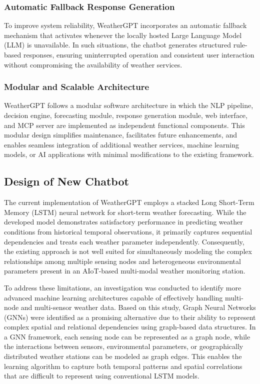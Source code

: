 \documentclass[12pt]{article}
\begin{document}
\subsubsection{Automatic Fallback Response Generation}
To improve system reliability, WeatherGPT incorporates an automatic fallback mechanism that activates whenever the locally hosted Large Language Model (LLM) is unavailable. In such situations, the chatbot generates structured rule-based responses, ensuring uninterrupted operation and consistent user interaction without compromising the availability of weather services.

\subsubsection{Modular and Scalable Architecture}
WeatherGPT follows a modular software architecture in which the NLP pipeline, decision engine, forecasting module, response generation module, web interface, and MCP server are implemented as independent functional components. This modular design simplifies maintenance, facilitates future enhancements, and enables seamless integration of additional weather services, machine learning models, or AI applications with minimal modifications to the existing framework.

\subsection{Design of New Chatbot}
The current implementation of WeatherGPT employs a stacked Long Short-Term Memory (LSTM) neural network for short-term weather forecasting. While the developed model demonstrates satisfactory performance in predicting weather conditions from historical temporal observations, it primarily captures sequential dependencies and treats each weather parameter independently. Consequently, the existing approach is not well suited for simultaneously modeling the complex relationships among multiple sensing nodes and heterogeneous environmental parameters present in an AIoT-based multi-modal weather monitoring station.

To address these limitations, an investigation was conducted to identify more advanced machine learning architectures capable of effectively handling multi-node and multi-sensor weather data. Based on this study, Graph Neural Networks (GNNs) were identified as a promising alternative due to their ability to represent complex spatial and relational dependencies using graph-based data structures. In a GNN framework, each sensing node can be represented as a graph node, while the interactions between sensors, environmental parameters, or geographically distributed weather stations can be modeled as graph edges. This enables the learning algorithm to capture both temporal patterns and spatial correlations that are difficult to represent using conventional LSTM models.
\end{document}
